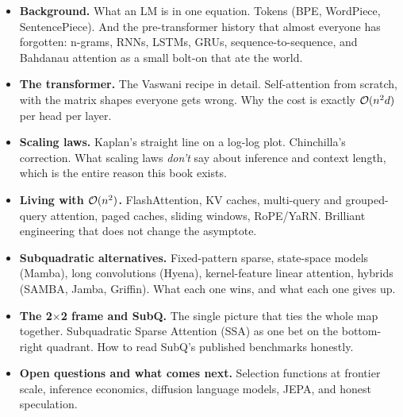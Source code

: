 \begin{itemize}
\item \textbf{Background.} What an LM is in one equation. Tokens
(BPE, WordPiece, SentencePiece). And the pre-transformer history that almost
everyone has forgotten: n-grams, RNNs, LSTMs, GRUs, sequence-to-sequence,
and Bahdanau attention as a small bolt-on that ate the world.

\item \textbf{The transformer.} The Vaswani recipe in detail.
Self-attention from scratch, with the matrix shapes everyone gets wrong.
Why the cost is exactly \(\mathcal{O}(n^2 d)\) per head per layer.

\item \textbf{Scaling laws.} Kaplan's straight line on a log-log
plot. Chinchilla's correction. What scaling laws \emph{don't} say about
inference and context length, which is the entire reason this book exists.

\item \textbf{Living with \(\mathcal{O}(n^2)\).} FlashAttention, KV
caches, multi-query and grouped-query attention, paged caches, sliding
windows, RoPE/YaRN. Brilliant engineering that does not change the asymptote.

\item \textbf{Subquadratic alternatives.} Fixed-pattern sparse,
state-space models (Mamba), long convolutions (Hyena), kernel-feature linear
attention, hybrids (SAMBA, Jamba, Griffin). What each one wins, and what
each one gives up.

\item \textbf{The 2$\times$2 frame and SubQ.} The single picture
that ties the whole map together. Subquadratic Sparse Attention
(SSA) as one bet on the bottom-right quadrant. How to read SubQ's published
benchmarks honestly.

\item \textbf{Open questions and what comes next.} Selection
functions at frontier scale, inference economics, diffusion language models,
JEPA, and honest speculation.
\end{itemize}

